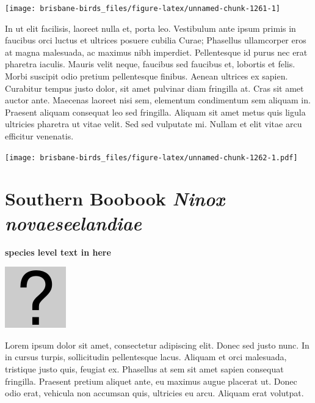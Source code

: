 \documentclass[]{book}
\let\origfigure\figure
\let\endorigfigure\endfigure
\renewenvironment{figure}[1][2] {
  \expandafter\origfigure\expandafter[H]
} {
  \endorigfigure
}
\begin{document}
\begin{figure}
\texttt{[image: brisbane-birds\_files/figure-latex/unnamed-chunk-1261-1]} \caption{insert figure caption}\label{fig:unnamed-chunk-1261}
\end{figure}

In ut elit facilisis, laoreet nulla et, porta leo. Vestibulum ante ipsum
primis in faucibus orci luctus et ultrices posuere cubilia Curae;
Phasellus ullamcorper eros at magna malesuada, ac maximus nibh
imperdiet. Pellentesque id purus nec erat pharetra iaculis. Mauris velit
neque, faucibus sed faucibus et, lobortis et felis. Morbi suscipit odio
pretium pellentesque finibus. Aenean ultrices ex sapien. Curabitur
tempus justo dolor, sit amet pulvinar diam fringilla at. Cras sit amet
auctor ante. Maecenas laoreet nisi sem, elementum condimentum sem
aliquam in. Praesent aliquam consequat leo sed fringilla. Aliquam sit
amet metus quis ligula ultricies pharetra ut vitae velit. Sed sed
vulputate mi. Nullam et elit vitae arcu efficitur venenatis.

\begin{figure}
\centering
\texttt{[image: brisbane-birds\_files/figure-latex/unnamed-chunk-1262-1.pdf]}
\caption{\label{fig:unnamed-chunk-1262}insert figure caption}
\end{figure}

\section{\texorpdfstring{Southern Boobook \emph{Ninox
novaeseelandiae}}{Southern Boobook Ninox novaeseelandiae}}\label{southern-boobook-ninox-novaeseelandiae}

\textbf{species level text in here}

\begin{figure}
\centering
\includegraphics{assets/missing.png}
\caption{No image for species}
\end{figure}

Lorem ipsum dolor sit amet, consectetur adipiscing elit. Donec sed justo
nunc. In in cursus turpis, sollicitudin pellentesque lacus. Aliquam et
orci malesuada, tristique justo quis, feugiat ex. Phasellus at sem sit
amet sapien consequat fringilla. Praesent pretium aliquet ante, eu
maximus augue placerat ut. Donec odio erat, vehicula non accumsan quis,
ultricies eu arcu. Aliquam erat volutpat.
\end{document}
